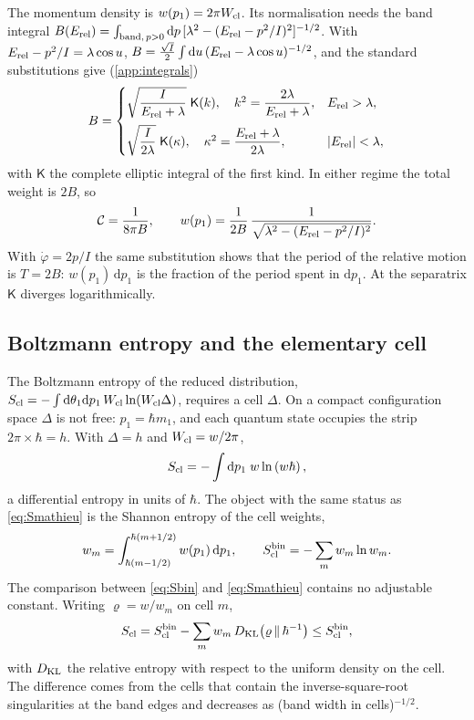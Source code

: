 \documentclass[preprint,12pt]{elsarticle}
\newcommand{\dd}{\mathrm{d}}
\newcommand{\Erel}{E_{\rm rel}}
\newcommand{\Scl}{S_{\rm cl}}
\begin{document}
The momentum density is $w(p_{1})=2\pi W_{\rm cl}$. Its normalisation needs
the band integral
$B(\Erel)=\int_{{\rm band},\,p>0}\dd p\,[\lambda^{2}-(\Erel-p^{2}/I)^{2}]^{-1/2}$.
With $\Erel-p^{2}/I=\lambda\cos u$, $B=\tfrac{\sqrt I}{2}\int\dd u\,
(\Erel-\lambda\cos u)^{-1/2}$, and the standard substitutions give
(\ref{app:integrals})
\begin{equation}
B=\begin{cases}
\sqrt{\dfrac{I}{\Erel+\lambda}}\;\mathsf{K}(k),\quad
k^{2}=\dfrac{2\lambda}{\Erel+\lambda}, & \Erel>\lambda,\\[10pt]
\sqrt{\dfrac{I}{2\lambda}}\;\mathsf{K}(\kappa),\quad
\kappa^{2}=\dfrac{\Erel+\lambda}{2\lambda}, & |\Erel|<\lambda,
\end{cases}
\label{eq:B}
\end{equation}
with $\mathsf{K}$ the complete elliptic integral of the first kind. In either
regime the total weight is $2B$, so
\begin{equation}
\mathcal{C}=\frac{1}{8\pi B},\qquad
w(p_{1})=\frac{1}{2B}\,\frac{1}{\sqrt{\lambda^{2}-(\Erel-p^{2}/I)^{2}}}.
\label{eq:wnorm}
\end{equation}
With $\dot\varphi=2p/I$ the same substitution shows that the period of the
relative motion is $T=2B$: $w(p_{1})\,\dd p_{1}$ is the fraction of the period
spent in $\dd p_{1}$. At the separatrix $\mathsf{K}$ diverges logarithmically.

\subsection{Boltzmann entropy and the elementary cell}
\label{sec:cell}

The Boltzmann entropy of the reduced distribution,
$\Scl=-\int\dd\theta_{1}\dd p_{1}\,W_{\rm cl}\ln(W_{\rm cl}\Delta)$, requires a
cell $\Delta$. On a compact configuration space $\Delta$ is not free:
$p_{1}=\hbar m_{1}$, and each quantum state occupies the strip
$2\pi\times\hbar=h$. With $\Delta=h$ and $W_{\rm cl}=w/2\pi$,
\begin{equation}
\Scl=-\int\dd p_{1}\;w\ln\left(w\hbar\right),
\label{eq:Sdiff}
\end{equation}
a differential entropy in units of $\hbar$. The object with the same status as
\eqref{eq:Smathieu} is the Shannon entropy of the cell weights,
\begin{equation}
w_{m}=\int_{\hbar(m-1/2)}^{\hbar(m+1/2)}w(p_{1})\,\dd p_{1},\qquad
\Scl^{\rm bin}=-\sum_{m}w_{m}\ln w_{m}.
\label{eq:Sbin}
\end{equation}
The comparison between \eqref{eq:Sbin} and \eqref{eq:Smathieu} contains no
adjustable constant. Writing $\varrho=w/w_{m}$ on cell $m$,
\begin{equation}
\Scl=\Scl^{\rm bin}-\sum_{m}w_{m}\,D_{\rm KL}\!\left(\varrho\,\Vert\,
\hbar^{-1}\right)\le\Scl^{\rm bin},
\end{equation}
with $D_{\rm KL}$ the relative entropy with respect to the uniform density on
the cell. The difference comes from the cells that contain the
inverse-square-root singularities at the band edges and decreases as
(band width in cells)$^{-1/2}$.
\end{document}
